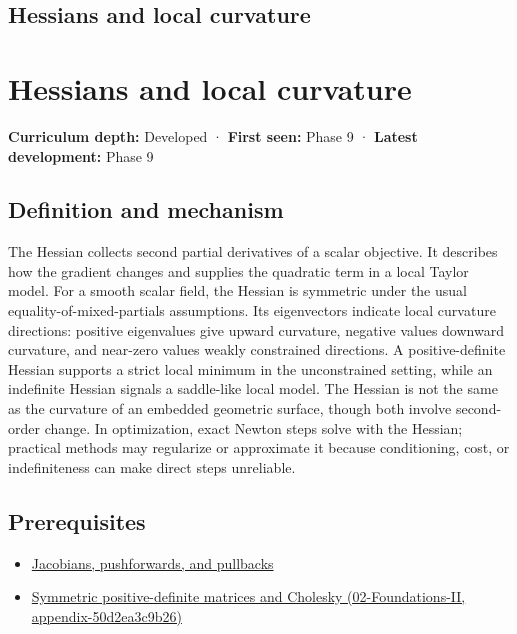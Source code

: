 \hypertarget{appendix-6ac071f8b50c}{}
\section*{Hessians and local curvature}
\chapter{Hessians and local curvature}\label{appendix-6ac071f8b50c-hessians-and-local-curvature}

\textbf{Curriculum depth:} Developed · \textbf{First seen:} Phase 9 · \textbf{Latest development:} Phase 9

\section{Definition and mechanism}\label{appendix-6ac071f8b50c-definition-and-mechanism}

The Hessian collects second partial derivatives of a scalar objective. It describes how the gradient changes and supplies the quadratic term in a local Taylor model. For a smooth scalar field, the Hessian is symmetric under the usual equality-of-mixed-partials assumptions. Its eigenvectors indicate local curvature directions: positive eigenvalues give upward curvature, negative values downward curvature, and near-zero values weakly constrained directions. A positive-definite Hessian supports a strict local minimum in the unconstrained setting, while an indefinite Hessian signals a saddle-like local model. The Hessian is not the same as the curvature of an embedded geometric surface, though both involve second-order change. In optimization, exact Newton steps solve with the Hessian; practical methods may regularize or approximate it because conditioning, cost, or indefiniteness can make direct steps unreliable.

\section{Prerequisites}\label{appendix-6ac071f8b50c-prerequisites}

\begin{itemize}
\tightlist
\item
  \hyperref[appendix-d8a7ddb675eb]{Jacobians, pushforwards, and pullbacks}
\item
  \href{../02-Foundations-II/main.pdf\#nameddest=appendix-50d2ea3c9b26}{Symmetric positive-definite matrices and Cholesky (02-Foundations-II, appendix-50d2ea3c9b26)}
\end{itemize}

